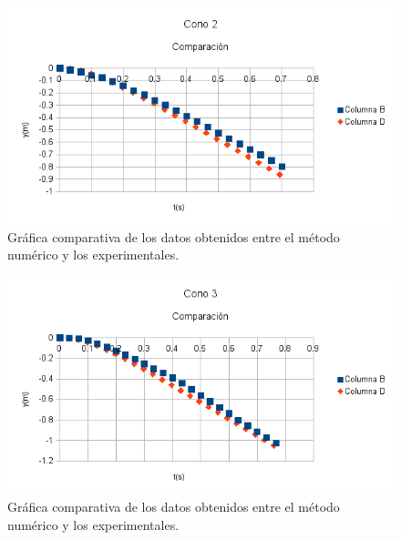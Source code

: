 \begin{figure}[h!]
    \centering
    \includegraphics{cono2}
    \caption{Gráfica comparativa de los datos obtenidos entre el método
    numérico y los experimentales.}
    \label{fig:Cono2}
\end{figure}

\begin{figure}[h!]
    \centering
    \includegraphics{cono3}
    \caption{Gráfica comparativa de los datos obtenidos entre el método
    numérico y los experimentales.}
    \label{fig:Cono3}
\end{figure}
